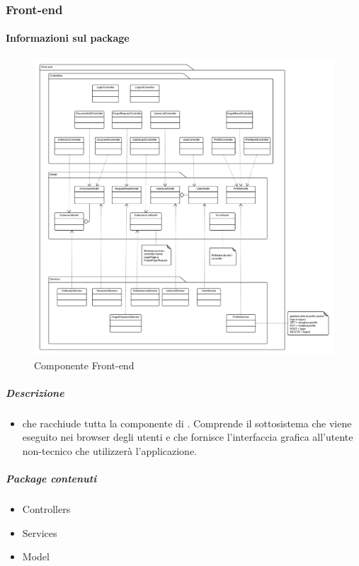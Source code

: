 
  \subsubsection{Front-end}
  \paragraph{Informazioni sul package}
    \begin{figure}[H] 
      \begin{center} 
        \includegraphics[width=\textwidth]{packages/Front-end.png}  
        \caption{Componente Front-end}
      \end{center}  
    \end{figure} 
  \subparagraph{Descrizione} 
    \begin{itemize}
    \item[]  che racchiude tutta la componente di . Comprende il sottosistema che viene eseguito nei browser degli utenti e che fornisce l'interfaccia grafica all'utente non-tecnico che utilizzerà l'applicazione.
    \end{itemize} 
    \subparagraph{Package contenuti} 
    \begin{itemize}
        \item Controllers
        \item Services
        \item Model
    \end{itemize}
